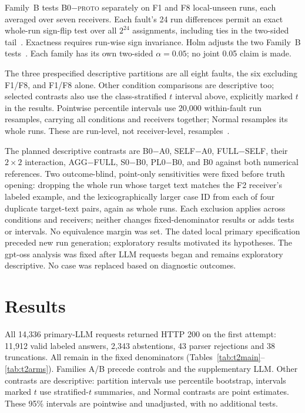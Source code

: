 \documentclass[conference]{IEEEtran}
\newcommand{\PROTO}{\textsc{proto}}
\newcommand{\cond}[1]{\textsf{#1}}
\begin{document}
Family~B tests \cond{B0}$-$\PROTO{} separately on F1 and F8 local-unseen runs, each averaged over seven receivers. Each fault's 24 run differences permit an exact whole-run sign-flip test over all $2^{24}$ assignments, including ties in the two-sided tail~\cite{winkler2014permutation}. Exactness requires run-wise sign invariance. Holm adjusts the two Family~B tests~\cite{holm1979}. Each family has its own two-sided $\alpha=0.05$; no joint 0.05 claim is made.

The three prespecified descriptive partitions are all eight faults, the six excluding F1/F8, and F1/F8 alone. Other condition comparisons are descriptive too; selected contrasts also use the class-stratified $t$ interval above, explicitly marked $t$ in the results. Pointwise percentile intervals use 20,000 within-fault run resamples, carrying all conditions and receivers together; Normal resamples its whole runs. These are run-level, not receiver-level, resamples~\cite{field2007bootstrap}.

The planned descriptive contrasts are \cond{B0}$-$\cond{A0}, \cond{SELF}$-$\cond{A0}, \cond{FULL}$-$\cond{SELF}, their $2\times2$ interaction, \cond{AGG}$-$\cond{FULL}, \cond{S0}$-$\cond{B0}, \cond{PL0}$-$\cond{B0}, and \cond{B0} against both numerical references. Two outcome-blind, point-only sensitivities were fixed before truth opening: dropping the whole run whose target text matches the F2 receiver's labeled example, and the lexicographically larger case ID from each of four duplicate target-text pairs, again as whole runs. Each exclusion applies across conditions and receivers; neither changes fixed-denominator results or adds tests or intervals. No equivalence margin was set. The dated local primary specification preceded new run generation; exploratory results motivated its hypotheses. The gpt-oss analysis was fixed after LLM requests began and remains exploratory descriptive. No case was replaced based on diagnostic outcomes.


\section{Results}
\label{sec:results}
All 14,336 primary-LLM requests returned HTTP 200 on the first attempt: 11,912 valid labeled answers, 2,343 abstentions, 43 parser rejections and 38 truncations. All remain in the fixed denominators (Tables~\ref{tab:t2main}--\ref{tab:t2arms}). Families A/B precede controls and the supplementary LLM. Other contrasts are descriptive: partition intervals use percentile bootstrap, intervals marked $t$ use stratified-$t$ summaries, and Normal contrasts are point estimates. These 95\% intervals are pointwise and unadjusted, with no additional tests.
\end{document}
